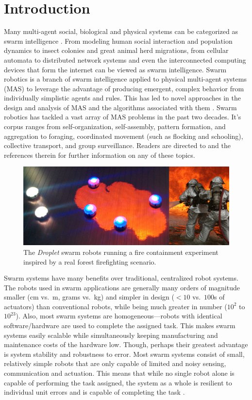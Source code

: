 \documentclass[12pt]{book}
\begin{document}
\chapter{Introduction}
Many multi-agent social, biological and physical systems can be categorized as swarm intelligence \cite{Beni2005}. From modeling human social interaction and population dynamics to insect colonies and great animal herd migrations, from cellular automata to distributed network systems and even the interconnected computing devices that form the internet can be viewed as swarm intelligence. Swarm robotics \cite{Sahin2005} is a branch of swarm intelligence applied to physical multi-agent systems (MAS) to leverage the advantage of producing emergent, complex behavior from individually simplistic agents and rules. This has led to novel approaches in the design and analysis of MAS and the algorithms associated with them \cite{Brambilla2013}. Swarm robotics has tackled a vast array of MAS problems in the past two decades. It's corpus ranges from self-organization, self-assembly, pattern formation, and aggregation to foraging, coordinated movement (such as flocking and schooling), collective transport, and group surveillance. Readers are directed to \cite{Bayindir2007} and the references therein for further information on any of these topics. 

\begin{figure}[!tb]
	\centering\includegraphics[width=\textwidth]{../assets/dropletfire.png}
	\centering\caption{The \emph{Droplet} swarm robots running a fire containment experiment inspired by a real forest firefighting scenario.}\label{fig:dropletfire}
\end{figure}

Swarm systems have many benefits over traditional, centralized robot systems. The robots used in swarm applications are generally many orders of magnitude smaller (cm vs.~m, grams vs.~kg) and simpler in design ($<10$ vs.~$100$s of actuators) than conventional robots, while being much greater in number ($10^2$ to $10^{23}$). Also, most swarm systems are homogeneous---robots with identical software/hardware are used to complete the assigned task. This makes swarm systems easily scalable while simultaneously keeping manufacturing and maintenance costs of the hardware low. Though, perhaps their greatest advantage is system stability and robustness to error. Most swarm systems consist of small, relatively simple robots that are only capable of limited and noisy sensing, communication and actuation. This means that while no single robot alone is capable of performing the task assigned, the system as a whole is resilient to individual unit errors and is capable of completing the task \cite{Winfield2005}.
\end{document}
